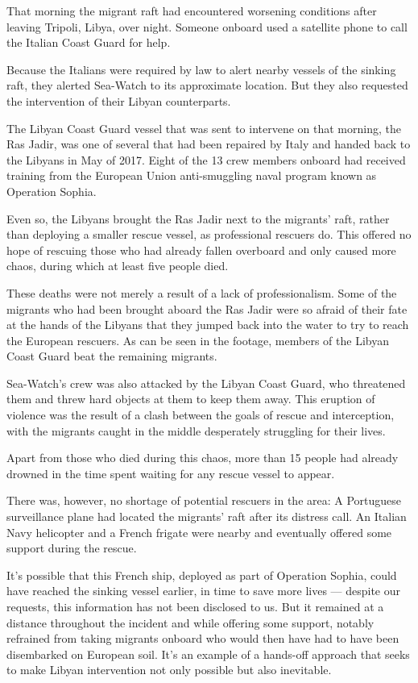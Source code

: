 That morning the migrant raft had encountered worsening conditions after
leaving Tripoli, Libya, over night. Someone onboard used a satellite
phone to call the Italian Coast Guard for help.

Because the Italians were required by law to alert nearby vessels of the
sinking raft, they alerted Sea-Watch to its approximate location. But
they also requested the intervention of their Libyan counterparts.

The Libyan Coast Guard vessel that was sent to intervene on that
morning, the Ras Jadir, was one of several that had been repaired by
Italy and handed back to the Libyans in May of 2017. Eight of the 13
crew members onboard had received training from the European Union
anti-smuggling naval program known as Operation Sophia.

Even so, the Libyans brought the Ras Jadir next to the migrants' raft,
rather than deploying a smaller rescue vessel, as professional rescuers
do. This offered no hope of rescuing those who had already fallen
overboard and only caused more chaos, during which at least five people
died.

These deaths were not merely a result of a lack of professionalism. Some
of the migrants who had been brought aboard the Ras Jadir were so afraid
of their fate at the hands of the Libyans that they jumped back into the
water to try to reach the European rescuers. As can be seen in the
footage, members of the Libyan Coast Guard beat the remaining migrants.

Sea-Watch's crew was also attacked by the Libyan Coast Guard, who
threatened them and threw hard objects at them to keep them away. This
eruption of violence was the result of a clash between the goals of
rescue and interception, with the migrants caught in the middle
desperately struggling for their lives.

Apart from those who died during this chaos, more than 15 people had
already drowned in the time spent waiting for any rescue vessel to
appear.

There was, however, no shortage of potential rescuers in the area: A
Portuguese surveillance plane had located the migrants' raft after its
distress call. An Italian Navy helicopter and a French frigate were
nearby and eventually offered some support during the rescue.

It's possible that this French ship, deployed as part of Operation
Sophia, could have reached the sinking vessel earlier, in time to save
more lives --- despite our requests, this information has not been
disclosed to us. But it remained at a distance throughout the incident
and while offering some support, notably refrained from taking migrants
onboard who would then have had to have been disembarked on European
soil. It's an example of a hands-off approach that seeks to make Libyan
intervention not only possible but also inevitable.

